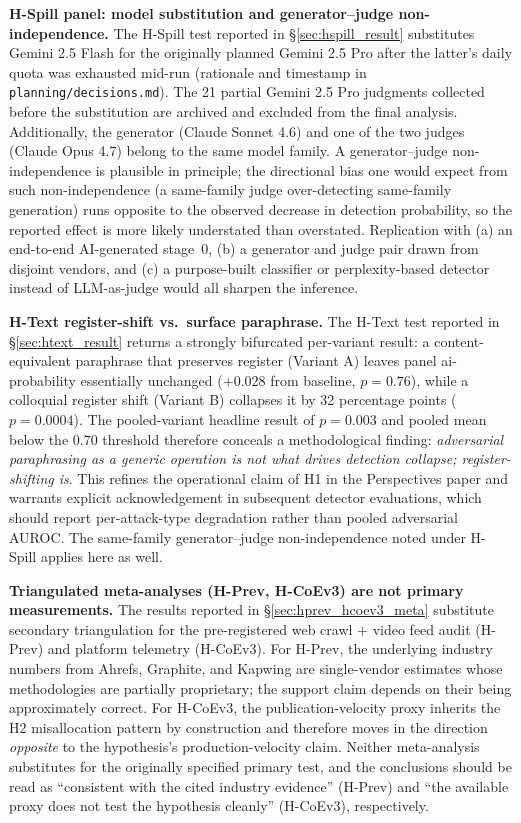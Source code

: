 \documentclass[12pt,a4paper]{article}
\begin{document}
\textbf{H-Spill panel: model substitution and generator--judge non-independence.} The H-Spill test reported in \S\ref{sec:hspill_result} substitutes Gemini 2.5 Flash for the originally planned Gemini 2.5 Pro after the latter's daily quota was exhausted mid-run (rationale and timestamp in \texttt{planning/decisions.md}). The 21 partial Gemini 2.5 Pro judgments collected before the substitution are archived and excluded from the final analysis. Additionally, the generator (Claude Sonnet 4.6) and one of the two judges (Claude Opus 4.7) belong to the same model family. A generator--judge non-independence is plausible in principle; the directional bias one would expect from such non-independence (a same-family judge over-detecting same-family generation) runs opposite to the observed decrease in detection probability, so the reported effect is more likely understated than overstated. Replication with (a) an end-to-end AI-generated stage~0, (b) a generator and judge pair drawn from disjoint vendors, and (c) a purpose-built classifier or perplexity-based detector instead of LLM-as-judge would all sharpen the inference.

\textbf{H-Text register-shift vs.\ surface paraphrase.} The H-Text test reported in \S\ref{sec:htext_result} returns a strongly bifurcated per-variant result: a content-equivalent paraphrase that preserves register (Variant A) leaves panel ai-probability essentially unchanged ($+0.028$ from baseline, $p = 0.76$), while a colloquial register shift (Variant B) collapses it by 32 percentage points ($p = 0.0004$). The pooled-variant headline result of $p = 0.003$ and pooled mean below the 0.70 threshold therefore conceals a methodological finding: \emph{adversarial paraphrasing as a generic operation is not what drives detection collapse; register-shifting is}. This refines the operational claim of H1 in the Perspectives paper and warrants explicit acknowledgement in subsequent detector evaluations, which should report per-attack-type degradation rather than pooled adversarial AUROC. The same-family generator--judge non-independence noted under H-Spill applies here as well.

\textbf{Triangulated meta-analyses (H-Prev, H-CoEv3) are not primary measurements.} The results reported in \S\ref{sec:hprev_hcoev3_meta} substitute secondary triangulation for the pre-registered web crawl + video feed audit (H-Prev) and platform telemetry (H-CoEv3). For H-Prev, the underlying industry numbers from Ahrefs, Graphite, and Kapwing are single-vendor estimates whose methodologies are partially proprietary; the support claim depends on their being approximately correct. For H-CoEv3, the publication-velocity proxy inherits the H2 misallocation pattern by construction and therefore moves in the direction \emph{opposite} to the hypothesis's production-velocity claim. Neither meta-analysis substitutes for the originally specified primary test, and the conclusions should be read as ``consistent with the cited industry evidence'' (H-Prev) and ``the available proxy does not test the hypothesis cleanly'' (H-CoEv3), respectively.
\end{document}
